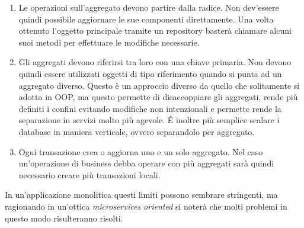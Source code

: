 \begin{enumerate}
	\item Le operazioni sull'aggregato devono partire dalla radice. Non dev'essere quindi possibile aggiornare le sue componenti direttamente. Una volta ottenuto l'oggetto principale tramite un repository basterà chiamare alcuni suoi metodi per effettuare le modifiche necessarie.
	\item Gli aggregati devono riferirsi tra loro con una chiave primaria. Non devono quindi essere utilizzati oggetti di tipo riferimento quando si punta ad un aggregato diverso.
	Questo è un approccio diverso da quello che solitamente si adotta in OOP, ma questo permette di disaccoppiare gli aggregati, rende più definiti i confini evitando modifiche non intenzionali e permette rende la separazione in servizi molto più agevole.
	\'E inoltre più semplice scalare i database in maniera verticale, ovvero separandolo per aggregato.
	\item Ogni transazione crea o aggiorna uno e un solo aggregato.
	Nel caso un'operazione di business debba operare con più aggregati sarà quindi necessario creare più transazioni locali.
\end{enumerate}

In un'applicazione monolitica questi limiti possono sembrare stringenti, ma ragionando in un'ottica \textit{microservices oriented} si noterà che molti problemi in questo modo risulteranno risolti.